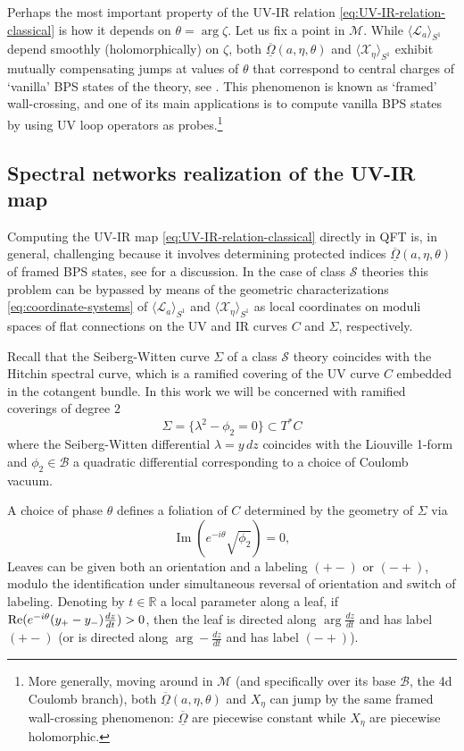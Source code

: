 \documentclass{article}
\numberwithin{equation}{section}
\newcommand{\CS}{\mathcal{S}}
\renewcommand{\Re}{{\rm{Re}}}
\def\be{\begin{equation}}
\def\ee{\end{equation}}
\def\CB{{\mathcal{B}}}
\def\CM{{\mathcal{M}}}
\def\scL{\mathscr{L}}
\def\scX{\mathscr{X}}
\def\fOmega{\overline{\underline{\Omega}}}
\begin{document}
Perhaps the most important property of the UV-IR relation \eqref{eq:UV-IR-relation-classical} is how it depends on $\theta= \arg \zeta$. Let us fix a point in $\CM$.
While $\langle \scL_a\rangle_{S^1}$ depend smoothly (holomorphically) on $\zeta$, both $\fOmega(a,\eta,\theta)$ and $\langle \scX_\eta\rangle_{S^1}$ exhibit mutually compensating jumps at values of $\theta$ that correspond to central charges of `vanilla' BPS states of the theory, see \cite[Section 6]{Gaiotto:2010be}.  This phenomenon is known as `framed' wall-crossing, and one of its main applications is to compute vanilla BPS states by using UV loop operators as probes.\footnote{
More generally, moving around in $\CM$ (and specifically over its base $\CB$, the 4d Coulomb branch), both $\fOmega(a,\eta,\theta)$ and $X_{\eta}$ can jump by the same framed wall-crossing phenomenon: $\fOmega$ are piecewise constant while $X_\eta$ are piecewise holomorphic.
}



\subsection{Spectral networks realization of the UV-IR map}\label{sec:spectral-networks-and-nonabelianization}


Computing the UV-IR map \eqref{eq:UV-IR-relation-classical} directly in QFT is, in general, challenging because it involves determining protected indices $\fOmega(a,\eta,\theta)$ of framed BPS states, see \cite{Moore:2015szp, Moore:2015qyu, Brennan:2018ura} for a discussion.
In the case of class $\CS$ theories this problem can be bypassed by means of the geometric characterizations \eqref{eq:coordinate-systems} of $\langle \scL_a\rangle_{S^1}$ and $\langle \scX_\eta\rangle_{S^1}$ as local coordinates on moduli spaces of flat connections on the UV and IR curves $C$ and $\Sigma$, respectively.



Recall that the Seiberg-Witten curve $\Sigma$ of a class $\CS$ theory coincides with the Hitchin spectral curve, which is a ramified covering of the UV curve $C$ embedded in the cotangent bundle.
In this work we will be concerned with ramified coverings of degree $2$
\be
	\Sigma = \{\lambda^2 - \phi_2 =0\} \subset T^*C
\ee
where the Seiberg-Witten differential $\lambda = y\, dz$ coincides with the Liouville 1-form and $\phi_2\in \CB$ a quadratic differential corresponding to a choice of Coulomb vacuum.

A choice of phase $\theta$ defines a foliation of $C$ determined by the geometry of $\Sigma$ via 
\begin{equation}
    \operatorname{Im}(e^{-i\theta}\sqrt{\phi_2}) = 0,
\end{equation}
Leaves can be given both an orientation {and} a labeling $(+-)$ or $(-+)$, modulo the identification under simultaneous reversal of orientation and switch of labeling. 
Denoting by $t\in \mathbb{R}$ a local parameter along a leaf, if $\Re(e^{-i\theta}(y_+-y_-)\frac{dz}{dt}) > 0$, then the leaf is directed along $\arg \frac{dz}{dt}$ and has label $(+-)$ (or is directed along $\arg -\frac{dz}{dt}$ and has label $(-+)$).
\end{document}
